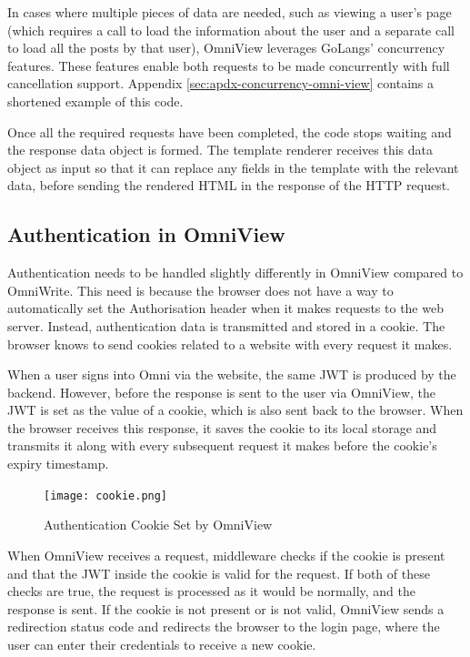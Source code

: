 In cases where multiple pieces of data are needed, such as viewing a user's page (which requires a call to load the information about the user and a separate call to load all the posts by that user), OmniView leverages GoLangs' concurrency features.
These features enable both requests to be made concurrently with full cancellation support.
Appendix \ref{sec:apdx-concurrency-omni-view} contains a shortened example of this code.

Once all the required requests have been completed, the code stops waiting and the response data object is formed.
The template renderer receives this data object as input so that it can replace any fields in the template with the relevant data, before sending the rendered HTML in the response of the HTTP request.

\subsection{Authentication in OmniView}
Authentication needs to be handled slightly differently in OmniView compared to OmniWrite.
This need is because the browser does not have a way to automatically set the Authorisation header when it makes requests to the web server.
Instead, authentication data is transmitted and stored in a cookie. The browser knows to send cookies related to a website with every request it makes. 

When a user signs into Omni via the website, the same JWT is produced by the backend.
However, before the response is sent to the user via OmniView, the JWT is set as the value of a cookie, which is also sent back to the browser.
When the browser receives this response, it saves the cookie to its local storage and transmits it along with every subsequent request it makes before the cookie's expiry timestamp. 

\begin{figure}[htbp]
\texttt{[image: cookie.png]}
\centering
\caption{Authentication Cookie Set by OmniView}
\label{fig:auth-cookie}
\end{figure}

When OmniView receives a request, middleware checks if the cookie is present and that the JWT inside the cookie is valid for the request.
If both of these checks are true, the request is processed as it would be normally, and the response is sent.
If the cookie is not present or is not valid, OmniView sends a redirection status code and redirects the browser to the login page, where the user can enter their credentials to receive a new cookie.

